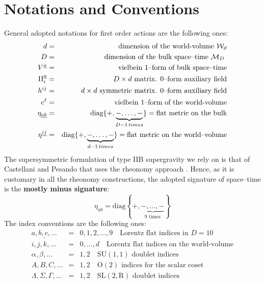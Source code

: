 \documentclass[a4paper,11pt]{article}
\begin{document}
\section{Notations and Conventions}
\label{notazie}
General adopted notations for first order actions are the
following ones:
\begin{eqnarray}
d & = & \mbox{ dimension of the world-volume $ \mathcal{W}_d$} \nonumber\\
D & = & \mbox{dimension of the bulk space--time $\mathcal{M}_D $ }\nonumber\\
V^{\underline{a}}&=& \mbox{vielbein $1$--form of bulk
space--time}\nonumber\\
\Pi^{\underline{a}}_{i} & = & D\times d \,\, \mbox{matrix. $0$--form auxiliary
field}\nonumber\\
h^{ij} &=& d\times d \,\,\mbox{symmetric matrix. $0$--form auxiliary
field}\nonumber\\
e^{\ell} &=& \mbox{vielbein $1$--form of the
world-volume}\nonumber\\
\eta_{\underline{ab}} & = & \mbox{diag}\{ +,\underbrace{-,\dots,-} _{D-1 \, times}
\} = \mbox{flat metric on the bulk}\nonumber\\
\eta^{\underline{ij}} & = & \mbox{diag} \{ +,\underbrace{-,\dots,-} _{d-1 \, times}
\} = \mbox{flat metric on the world--volume}\nonumber\\
\label{definizie}
\end{eqnarray}
The supersymmetric formulation of type IIB supergravity we rely on is
that of Castellani and Pesando \cite{igorleo} that uses the rheonomy
approach \cite{castdauriafre}. Hence, as it is customary in all the
rheonomy constructions, the adopted signature of space--time is the
\textbf{mostly minus signature}:
\begin{equation}
  \eta_{\underline{ab}}= \mbox{diag} \left\{ + ,\underbrace{
  -,\dots,-}_{\mbox{9 times}} \right \}
\label{mostmin}
\end{equation}
The index conventions are the following ones:
\begin{eqnarray}
\underline{a,b,c,\dots} & = & 0,1,2,\dots,9 \quad \mbox{Lorentz flat indices in $D=10$} \nonumber\\
i,j,k,\dots & = & 0,\dots ,d  \quad \mbox{Lorentz flat indices on the world-volume}\\
\alpha, \beta, \dots & = &  1,2  \quad \mbox{$\mathrm{SU(1,1)}$ doublet
indices}\nonumber\\
A,B,C,\dots & = & 1,2 \quad \mbox{$\mathrm{O(2)}$ indices for the scalar
coset}\nonumber\\
\Lambda,\Sigma,\Gamma,\dots &=& 1,2 \quad \mbox{$\mathrm{SL(2,R)}$ doublet
indices}
\label{indeconv}
\end{eqnarray}
\end{document}
